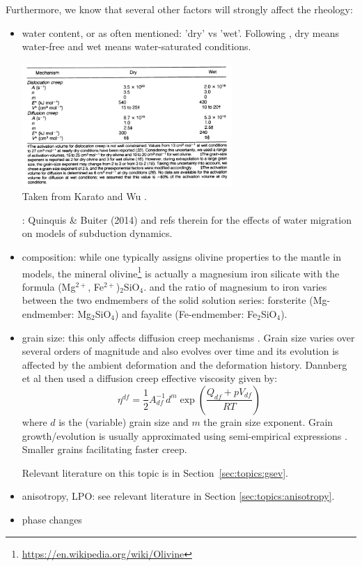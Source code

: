 Furthermore, we know that several other factors will strongly affect the rheology:
\begin{itemize}
\item water content, or as often mentioned: 'dry' vs 'wet'. Following \cite{kawu93}, 
dry means water-free and wet means water-saturated conditions.
\begin{center}
\includegraphics[width=8cm]{images/rheology/kawu93}\\
{\captionfont Taken from Karato and Wu \cite{kawu93}.}
\end{center}
\Literature: Quinquis \& Buiter (2014) \cite{qubu14} and refs therein for the effects of water
migration on models of subduction dynamics.

\item composition: while one typically assigns olivine properties to the mantle in models, 
the mineral olivine\footnote{\url{https://en.wikipedia.org/wiki/Olivine}} 
is actually a magnesium iron silicate with the formula (Mg$^{2+}$, Fe$^{2+}$)$_2$SiO$_4$.
and the ratio of magnesium to iron varies between the two endmembers of the solid solution series: 
forsterite (Mg-endmember: Mg$_2$SiO$_4$) and fayalite (Fe-endmember: Fe$_2$SiO$_4$).

\item grain size: this only affects diffusion creep mechanisms \cite{kawu93}. 
Grain size varies over several orders of magnitude and also evolves over time and 
its evolution is affected by the ambient deformation and the deformation history.
Dannberg et al \cite{daef17} then used a diffusion creep effective viscosity 
given by:
\[
\eta^{df} = \frac{1}{2} A_{df}^{-1} d^m \exp \left( \frac{Q_{df}+pV_{df}}{RT}  \right)
\] 
where $d$ is the (variable) grain size and $m$ the grain size exponent. Grain growth/evolution 
is usually approximated using semi-empirical expressions \cite[section~2.2]{daef17}.
Smaller grains facilitating faster creep.

Relevant literature on this topic is in Section~\ref{sec:topics:gsev}.

\item anisotropy, LPO: see relevant literature in Section \ref{sec:topics:anisotropy}.

\item phase changes 
\end{itemize}


